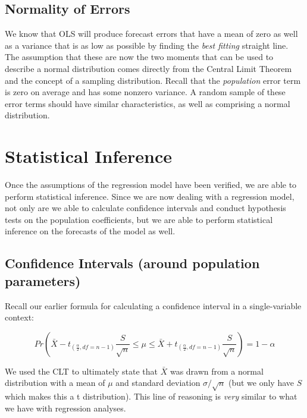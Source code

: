 \documentclass[
]{book}
\begin{document}
\hypertarget{normality-of-errors}{%
\subsection{Normality of Errors}\label{normality-of-errors}}

We know that OLS will produce forecast errors that have a mean of zero as well as a variance that is as low as possible by finding the \emph{best fitting} straight line. The assumption that these are now the two moments that can be used to describe a normal distribution comes directly from the Central Limit Theorem and the concept of a sampling distribution. Recall that the \emph{population} error term is zero on average and has some nonzero variance. A random sample of these error terms should have similar characteristics, as well as comprising a normal distribution.

\hypertarget{statistical-inference}{%
\section{Statistical Inference}\label{statistical-inference}}

Once the assumptions of the regression model have been verified, we are able to perform statistical inference. Since we are now dealing with a regression model, not only are we able to calculate confidence intervals and conduct hypothesis tests on the population coefficients, but we are able to perform statistical inference on the forecasts of the model as well.

\hypertarget{confidence-intervals-around-population-parameters}{%
\subsection{Confidence Intervals (around population parameters)}\label{confidence-intervals-around-population-parameters}}

Recall our earlier formula for calculating a confidence interval in a single-variable context:

\[Pr\left(\bar{X}-t_{(\frac{\alpha}{2},df=n-1)}\frac{S}{\sqrt{n}} \leq \mu \leq \bar{X}+t_{(\frac{\alpha}{2},df=n-1)}\frac{S}{\sqrt{n}}\right)=1-\alpha\]

We used the CLT to ultimately state that \(\bar{X}\) was drawn from a normal distribution with a mean of \(\mu\) and standard deviation \(\sigma/\sqrt{n}\) (but we only have \(S\) which makes this a t distribution). This line of reasoning is \emph{very} similar to what we have with regression analyses.
\end{document}
